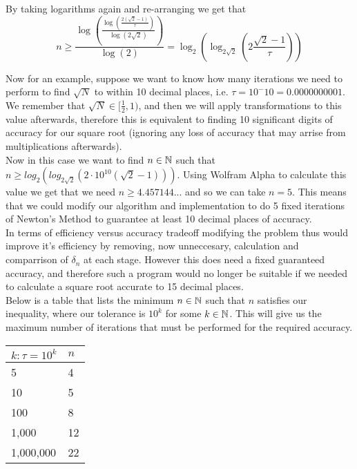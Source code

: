 By taking logarithms again and re-arranging we get that
\[n \ge \frac{\log\left(\frac{\log\left(\frac{2(\sqrt{2} - 1)}{\tau}\right)}{\log(2\sqrt{2})}\right)}{\log(2)} = \log_2\left(\log_{2\sqrt{2}}\left(2\frac{\sqrt{2} - 1}{\tau}\right)\right)\]

Now for an example, suppose we want to know how many iterations we need to perform to find \(\sqrt{N}\) to within 10 decimal places, i.e. \(\tau = 10^-10 = 0.0000000001\). We remember that \(\sqrt{N} \in [\frac{1}{2}, 1)\), and then we will apply transformations to this value afterwards, therefore this is equivalent to finding 10 significant digits of accuracy for our square root (ignoring any loss of accuracy that may arrise from multiplications afterwards).\\

Now in this case we want to find \(n \in \mathbb{N}\) such that \(n \ge log_2(log_{2\sqrt{2}}(2\cdot10^{10}(\sqrt{2}-1)))\). Using Wolfram Alpha to calculate this value we get that we need \(n \ge 4.457144...\) and so we can take \(n = 5\). This means that we could modify our algorithm and implementation to do 5 fixed iterations of Newton's Method to guarantee at least 10 decimal places of accuracy.\\

In terms of efficiency versus accuracy tradeoff modifying the problem thus would improve it's efficiency by removing, now unneccesary, calculation and comparrison of \(\delta_n\) at each stage. However this does need a fixed guaranteed accuracy, and therefore such a program would no longer be suitable if we needed to calculate a square root accurate to 15 decimal places.\\

Below is a table that lists the minimum \(n \in \mathbb{N}\) such that \(n\) satisfies our inequality, where our tolerance is \(10^k\) for some \(k \in \mathbb{N}\). This will give us the maximum number of iterations that must be performed for the required accuracy.

\begin{center}
\begin{tabular}{|p{3cm}|p{3cm}|}
\hline
\(k : \tau = 10^k\) & \(n\)\\\hline
5 & 4 \\\hline
10 & 5 \\\hline
100 & 8 \\\hline
1,000 & 12 \\\hline
1,000,000 & 22\\\hline
\end{tabular}
\end{center}

